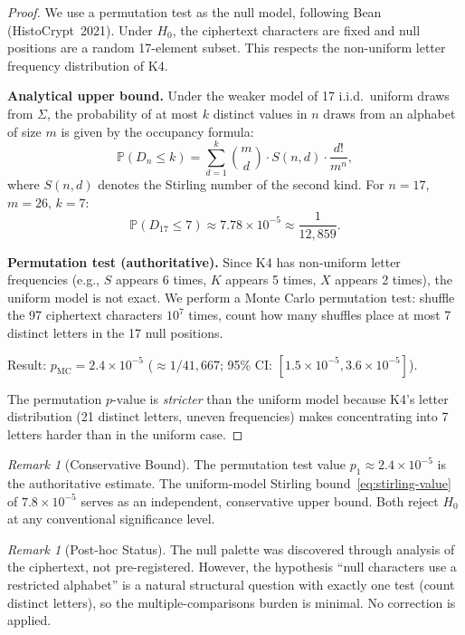 \documentclass[11pt]{article}
\theoremstyle{plain}
\theoremstyle{definition}
\theoremstyle{remark}
\newtheorem{remark}[theorem]{Remark}
\newcommand{\Prob}{\mathbb{P}}
\newcommand{\pvalue}{p\text{-value}}
\begin{document}
\begin{proof}
We use a permutation test as the null model, following Bean (HistoCrypt~2021). Under $H_0$, the ciphertext characters are fixed and null positions are a random 17-element subset. This respects the non-uniform letter frequency distribution of K4.

\textbf{Analytical upper bound.} Under the weaker model of 17 i.i.d.\ uniform draws from $\Sigma$, the probability of at most $k$ distinct values in $n$ draws from an alphabet of size $m$ is given by the occupancy formula:
\begin{equation}
\Prob(D_n \leq k) = \sum_{d=1}^{k} \binom{m}{d} \cdot S(n,d) \cdot \frac{d!}{m^n},
\label{eq:stirling}
\end{equation}
where $S(n,d)$ denotes the Stirling number of the second kind. For $n=17$, $m=26$, $k=7$:
\begin{equation}
\Prob(D_{17} \leq 7) \approx 7.78 \times 10^{-5} \approx \frac{1}{12{,}859}.
\label{eq:stirling-value}
\end{equation}

\textbf{Permutation test (authoritative).} Since K4 has non-uniform letter frequencies (e.g., $S$ appears 6 times, $K$ appears 5 times, $X$ appears 2 times), the uniform model is not exact. We perform a Monte Carlo permutation test: shuffle the 97 ciphertext characters $10^7$ times, count how many shuffles place at most 7 distinct letters in the 17 null positions.

Result: $p_{\text{MC}} = 2.4 \times 10^{-5}$ ($\approx 1/41{,}667$; 95\% CI: $[1.5 \times 10^{-5}, 3.6 \times 10^{-5}]$).

The permutation $\pvalue$ is \emph{stricter} than the uniform model because K4's letter distribution (21 distinct letters, uneven frequencies) makes concentrating into 7 letters harder than in the uniform case.
\end{proof}

\begin{remark}[Conservative Bound]
The permutation test value $p_1 \approx 2.4 \times 10^{-5}$ is the authoritative estimate. The uniform-model Stirling bound~\eqref{eq:stirling-value} of $7.8 \times 10^{-5}$ serves as an independent, conservative upper bound. Both reject $H_0$ at any conventional significance level.
\end{remark}

\begin{remark}[Post-hoc Status]
The null palette was discovered through analysis of the ciphertext, not pre-registered. However, the hypothesis ``null characters use a restricted alphabet'' is a natural structural question with exactly one test (count distinct letters), so the multiple-comparisons burden is minimal. No correction is applied.
\end{remark}
\end{document}
